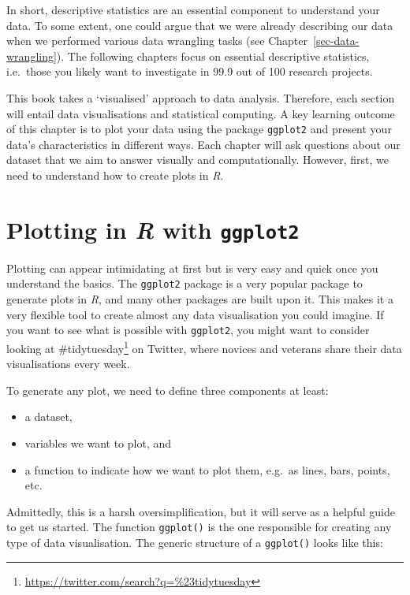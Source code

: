 \documentclass[
  letterpaper,
]{krantz}
\renewcommand{\href}[2]{#2\footnote{\url{#1}}}
\begin{document}
In short, descriptive statistics are an essential component to
understand your data. To some extent, one could argue that we were
already describing our data when we performed various data wrangling
tasks (see Chapter~\ref{sec-data-wrangling}). The following chapters
focus on essential descriptive statistics, i.e.~those you likely want to
investigate in 99.9 out of 100 research projects.

This book takes a `visualised' approach to data analysis. Therefore,
each section will entail data visualisations and statistical computing.
A key learning outcome of this chapter is to plot your data using the
package \texttt{ggplot2} and present your data's characteristics in
different ways. Each chapter will ask questions about our dataset that
we aim to answer visually and computationally. However, first, we need
to understand how to create plots in \emph{R}.

\section{\texorpdfstring{Plotting in \emph{R} with
\texttt{ggplot2}}{Plotting in R with ggplot2}}\label{sec-plotting-in-r-with-ggplot2}

Plotting can appear intimidating at first but is very easy and quick
once you understand the basics. The \texttt{ggplot2} package is a very
popular package to generate plots in \emph{R}, and many other packages
are built upon it. This makes it a very flexible tool to create almost
any data visualisation you could imagine. If you want to see what is
possible with \texttt{ggplot2}, you might want to consider looking at
\href{https://twitter.com/search?q=\%23tidytuesday}{\#tidytuesday} on
Twitter, where novices and veterans share their data visualisations
every week.

To generate any plot, we need to define three components at least:

\begin{itemize}
\item
  a dataset,
\item
  variables we want to plot, and
\item
  a function to indicate how we want to plot them, e.g.~as lines, bars,
  points, etc.
\end{itemize}

Admittedly, this is a harsh oversimplification, but it will serve as a
helpful guide to get us started. The function \texttt{ggplot()} is the
one responsible for creating any type of data visualisation. The generic
structure of a \texttt{ggplot()} looks like this:
\end{document}
